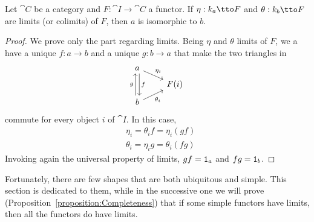 \begin{proposition}\label{proposition:LimitsAreIsomorphic}
Let \(\cat C\) be a category and \(F : \cat I \to \cat C\) a functor. If \(\eta : k_a \tto F\) and \(\theta : k_b \tto F\) are limits (or colimits) of \(F\), then \(a\) is isomorphic to \(b\).
\end{proposition}

\begin{proof}
We prove only the part regarding limits. Being \(\eta\) and \(\theta\) limits of \(F\), we a have a unique \(f : a \to b\) and a unique \(g : b \to a\) that make the two triangles in
\[\begin{tikzcd}[row sep=tiny]
a \ar["{\eta_i}", dr] \ar["f", dd, shift left] \\
& F(i) \\
b \ar["{\theta_i}", ur, swap] \ar["g", uu, shift left]
\end{tikzcd}\] 
commute for every object \(i\) of \(\cat I\). In this case,
\[\begin{aligned}
& \eta_i = \theta_i f = \eta_i (gf) \\
& \theta_i = \eta_i g = \theta_i (fg)
\end{aligned}\]
Invoking again the universal property of limits, \(gf = \mathtt 1_a\) and \(fg = \mathtt 1_b\).
\end{proof}

Fortunately, there are few shapes that are both ubiquitous and simple. This section is dedicated to them, while in the successive one we will prove (Proposition~\ref{proposition:Completeness}) that if some simple functors have limits, then all the functors do have limits.


